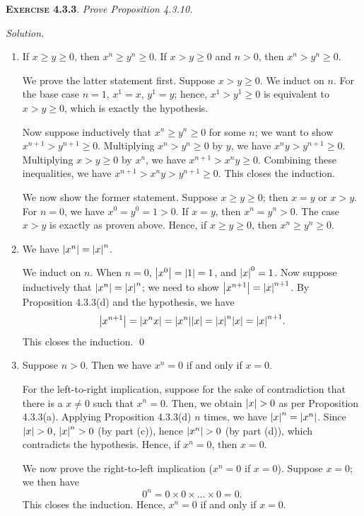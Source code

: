 \documentclass[12pt]{article}
\theoremstyle{remark}
\newenvironment{exer}[2]{
    \noindent \setlength{\parskip}{1em}%
    \textsc{\textbf{Exercise #1}}. \textit{#2} \par
    \noindent \textit{Solution.} %
}{\bigskip}
\begin{document}
\begin{exer}{4.3.3}{
    Prove Proposition 4.3.10.
}
\begin{enumerate}[topsep=0mm,label=(\alph*)]
        \item[(c)] If $x \ge y \ge 0$, then $x^n \ge y^n \ge 0$. If $x > y \ge 0$ and $n > 0$, then $x^n > y^n \ge 0$.

            We prove the latter statement first.
            Suppose $x > y \ge 0$.
            We induct on $n$.
            For the base case $n = 1$, $x^1 = x$, $y^1 = y$; hence, $x^1 > y^1 \ge 0$ is equivalent to $x > y \ge 0$, which is exactly the hypothesis.
            
            Now suppose inductively that $x^n \ge y^n \ge 0$ for some $n$;
            we want to show $x^{n+1} > y^{n+1} \ge 0$.
            Multiplying $x^n > y^n \ge 0$ by $y$, we have $x^n y > y^{n+1} \ge 0$.
            Multiplying $x > y \ge 0$ by $x^n$, we have $x^{n+1} > x^n y \ge 0$.
            Combining these inequalities, we have $x^{n+1} > x^n y > y^{n+1} \ge 0$.
            This closes the induction.

            We now show the former statement.
            Suppose $x \ge y \ge 0$; then $x = y$ or $x > y$.
            For $n = 0$, we have $x^0 = y^0 = 1 > 0$.
            If $x = y$, then $x^n = y^n > 0$.
            The case $x > y$ is exactly as proven above.
            Hence, if $x \ge y \ge 0$, then $x^n \ge y^n \ge 0$.

        \item[(d)] We have $\abs{x^n} = \abs{x}^n$.

            We induct on $n$.
            When $n = 0$, $\abs{x^0} = \abs{1} = 1$, and $\abs{x}^0 = 1$.
            Now suppose inductively that $\abs{x^n} = \abs{x}^n$; we need to show $\abs{x^{n+1}} = \abs{x}^{n+1}$.
            By Proposition 4.3.3(d) and the hypothesis, we have
            \[
                \abs{x^{n+1}} = \abs{x^n x} = \abs{x^n}\abs{x} = \abs{x}^n \abs{x} = \abs{x}^{n+1}.
            \]
            This closes the induction. \qed
            
        \item[(b)] Suppose $n > 0$. Then we have $x^n = 0$ if and only if $x = 0$.

            For the left-to-right implication, suppose for the sake of contradiction that there is a $x \ne 0$ such that $x^n = 0$.
            Then, we obtain $\abs{x} > 0$ as per Proposition 4.3.3(a).
            Applying Proposition 4.3.3(d) $n$ times, we have $\abs{x}^n = \abs{x^n}$.
            Since $\abs{x} > 0$, $\abs{x}^n > 0$ (by part (c)), hence $\abs{x^n} > 0$ (by part (d)), which contradicts the hypothesis.
            Hence, if $x^n = 0$, then $x = 0$.

            We now prove the right-to-left implication ($x^n = 0$ if $x = 0$).
            Suppose $x = 0$; we then have
            \[
                0^n = 0 \times 0 \times \ldots \times 0 = 0.
            \]
            This closes the induction.
            Hence, $x^n = 0$ if and only if $x = 0$.
        
    \end{enumerate}
\end{exer}
\end{document}
